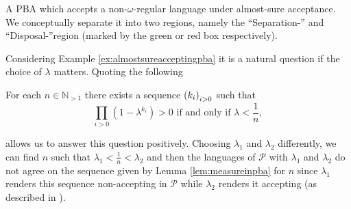 \begin{drawing}
  \caption{A \ac{PBA} which accepts a non-$\omega$-regular language under
  almost-sure acceptance. We conceptually separate it into two regions, namely
  the \enquote{Separation-} and \enquote{Disposal-}region (marked by the green
  or red box respectively).}
  \label{fig:almostsureacceptingpba}
  \begin{center}
  \end{center}
\end{drawing}
Considering Example \ref{ex:almostsureacceptingpba} it is a natural question if
the choice of $\lambda$ matters. Quoting the following
\begin{lemma}
  \cite[Lemma 1]{DecProblemsForProbAuto}
  For each $n\in\mathbb{N}_{>1}$ there exists a sequence $\left(k_{i}\right)_{i>0}$
  such that
  \begin{equation*}
    \prod_{i>0}(1-\lambda^{k_{i}}) > 0 \text{ if and only if }
    \lambda<\frac{1}{n},
  \end{equation*}
  \label{lem:measureinpba}
\end{lemma}
allows us to answer this question positively. Choosing $\lambda_{1}$ and
$\lambda_{2}$ differently, we can find $n$ such that 
$\lambda_{1} < \frac{1}{n} < \lambda_{2}$ and then the languages of 
$\mathcal{P}$ with $\lambda_{1}$ and $\lambda_{2}$ do not agree on the sequence
given by Lemma \ref{lem:measureinpba} for $n$ since $\lambda_{1}$ renders
this sequence non-accepting in $\mathcal{P}$ while $\lambda_{2}$ renders it
accepting (as described in \cite{DecProblemsForProbAuto}).

